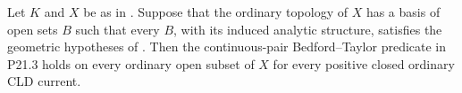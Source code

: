 \begin{corollary}
\label{cor:p213-residual-picard-curve-local-interleaved-tower-basis-bt}
Let $K$ and $X$ be as in
.
Suppose that the ordinary topology of $X$ has a basis of open sets $B$ such
that every $B$, with its induced analytic structure, satisfies the
geometric hypotheses of
.  Then the
continuous-pair Bedford--Taylor predicate in P21.3 holds on every ordinary
open subset of $X$ for every positive closed ordinary CLD current.
\end{corollary}
